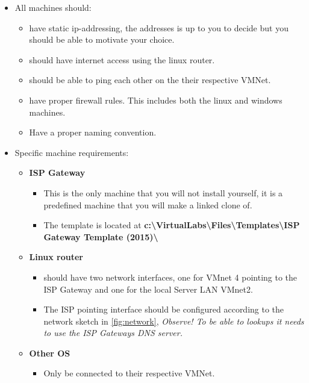 \documentclass[paper=a4, fontsize=11pt]{report} %
\begin{document}
\begin{itemize}
    \item All machines should:
    \begin{itemize}
        \item have static ip-addressing, the addresses is up to you to decide but you should be able to motivate your choice. 
	\item should have internet access using the linux router.
	\item should be able to ping each other on the their respective VMNet.
        \item have proper firewall rules. This includes both the linux and windows machines.
    	\item Have a proper naming convention.
    \end{itemize}
	\item Specific machine requirements:
    \begin{itemize}
        \item \textbf{ISP Gateway}
        \begin{itemize}
		\item This is the only machine that you will not install yourself, it is a predefined machine that you will make a linked clone of.
        	\item The template is located at \textbf{c:\textbackslash VirtualLabs\textbackslash Files\textbackslash Templates\textbackslash ISP Gateway Template (2015)\textbackslash }
        \end{itemize}

        \item \textbf{Linux router}
        \begin{itemize}
		\item should have two network interfaces, one for VMnet 4 pointing to the ISP Gateway and one for the local Server LAN VMnet2.
            	\item The ISP pointing interface should be configured according to the network sketch in \figurename \ref{fig:network}, \textit{Observe! To be able to lookups it needs to use the ISP Gateways DNS server.}
        \end{itemize}
        
        \item \textbf{Other OS}
        \begin{itemize}
		\item Only be connected to their respective VMNet.
        \end{itemize}
        
    \end{itemize}
\end{itemize}
\end{document}
